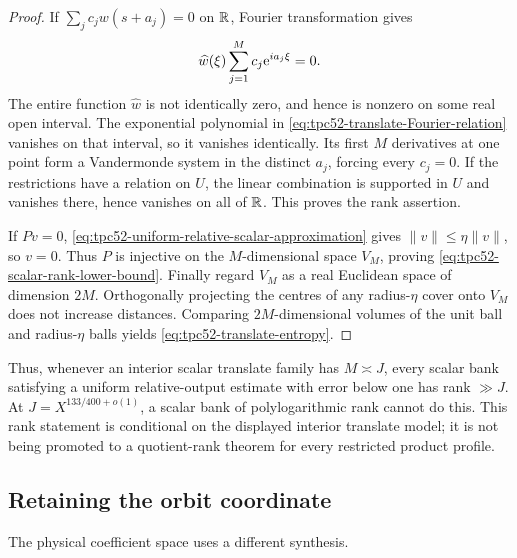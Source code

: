 \begin{proof}
If \(\sum_jc_jw(s+a_j)=0\) on \(\mathbb R\), Fourier transformation gives
\begin{equation}
 \widehat w(\xi)\sum_{j=1}^M c_j\mathrm e^{ia_j\xi}=0.
 \label{eq:tpc52-translate-Fourier-relation}
\end{equation}
The entire function \(\widehat w\) is not identically zero, and hence
is nonzero on some real open interval.  The exponential polynomial in
\eqref{eq:tpc52-translate-Fourier-relation} vanishes on that interval,
so it vanishes identically.  Its first \(M\) derivatives at one point
form a Vandermonde system in the distinct \(a_j\), forcing every
\(c_j=0\).  If the restrictions have a relation on \(U\), the linear
combination is supported in \(U\) and vanishes there, hence vanishes on
all of \(\mathbb R\).  This proves the rank assertion.

If \(Pv=0\), \eqref{eq:tpc52-uniform-relative-scalar-approximation}
gives \(\|v\|\leq\eta\|v\|\), so \(v=0\).  Thus \(P\) is injective
on the \(M\)-dimensional space \(V_M\), proving
\eqref{eq:tpc52-scalar-rank-lower-bound}.  Finally regard \(V_M\) as a
real Euclidean space of dimension \(2M\).  Orthogonally projecting the
centres of any radius-\(\eta\) cover onto \(V_M\) does not increase
distances.  Comparing \(2M\)-dimensional volumes of the unit ball and
radius-\(\eta\) balls yields
\eqref{eq:tpc52-translate-entropy}.
\end{proof}

Thus, whenever an interior scalar translate family has
\(M\asymp J\), every scalar bank satisfying a uniform relative-output
estimate with error below one has rank \(\gg J\).  At
\(J=X^{133/400+o(1)}\), a scalar bank of polylogarithmic rank cannot do
this.  This rank statement is conditional on the displayed interior
translate model; it is not being promoted to a quotient-rank theorem
for every restricted product profile.

\subsection{Retaining the orbit coordinate}

The physical coefficient space uses a different synthesis.

